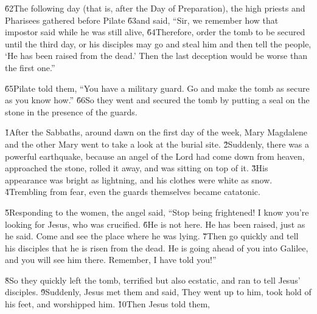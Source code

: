 \v{62}The following day (that is, after the Day of Preparation), the high priests and Pharisees gathered before Pilate \v{63}and said, ``Sir, we remember how that impostor said while he was still alive,   \v{64}Therefore, order the tomb to be secured until the third day, or his disciples may go and steal him and then tell the people, `He has been raised from the dead.' Then the last deception would be worse than the first one.''

\v{65}Pilate told them, ``You have a military guard. Go and make the tomb as secure as you know how.'' \v{66}So they went and secured the tomb by putting a seal on the stone in the presence of the guards.

\v{1}After the Sabbaths, around dawn on the first day of the week, Mary Magdalene and the other Mary went to take a look at the burial site. \v{2}Suddenly, there was a powerful earthquake, because an angel of the Lord had come down from heaven, approached the stone, rolled it away, and was sitting on top of it. \v{3}His appearance was bright as lightning, and his clothes were white as snow. \v{4}Trembling from fear, even the guards themselves became catatonic.

\v{5}Responding to the women, the angel said, ``Stop being frightened! I know you're looking for Jesus, who was crucified. \v{6}He is not here. He has been raised, just as he said. Come and see the place where he was lying. \v{7}Then go quickly and tell his disciples that he is risen from the dead. He is going ahead of you into Galilee, and you will see him there. Remember, I have told you!''

\v{8}So they quickly left the tomb, terrified but also ecstatic, and ran to tell Jesus' disciples. \v{9}Suddenly, Jesus met them and said,  They went up to him, took hold of his feet, and worshipped him. \v{10}Then Jesus told them, 


